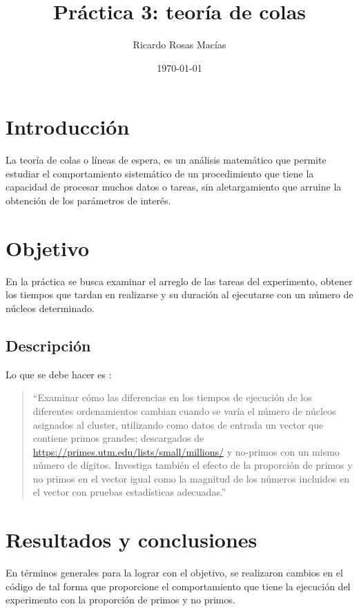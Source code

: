 \documentclass[12pt, letterpaper] {article}
\author{Ricardo Rosas Macías}
\title{Práctica 3: teoría de colas}
\date{\today}
\begin{document}
\maketitle



\section{Introducción}

La teoría de colas o líneas de espera, es un análisis matemático que permite estudiar el comportamiento sistemático de un procedimiento que tiene la capacidad de procesar muchos datos o tareas, sin aletargamiento que arruine la obtención de los parámetros de interés. 

 \section{Objetivo}

En la práctica se busca examinar el arreglo de las tareas del experimento, obtener los tiempos que tardan en realizarse y su duración al ejecutarse con un número de núcleos determinado. 

 \subsection{Descripción}

Lo que se debe hacer es \cite{elisawebTC}:
\begin{quotation}
 ``Examinar cómo las diferencias en los tiempos de ejecución de los diferentes ordenamientos cambian cuando se varía el número de núcleos asignados al cluster, utilizando como datos de entrada un vector que contiene primos grandes; descargados de \url{https://primes.utm.edu/lists/small/millions/} y no-primos con un mismo número de dígitos. Investiga también el efecto de la proporción de primos y no primos en el vector igual como la magnitud de los números incluidos en el vector con pruebas estadísticas adecuadas.''
\end{quotation}


\section{Resultados y conclusiones}

En términos generales para la lograr con el objetivo, se realizaron cambios en el código \cite{MPP3C}\cite{P3LSa} de tal forma que proporcione el comportamiento que tiene la ejecución del experimento con la proporción de primos y no primos. 
\end{document}
